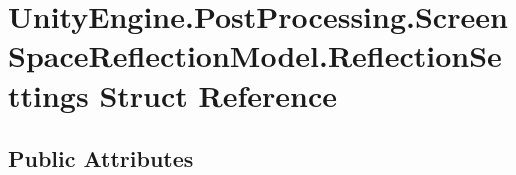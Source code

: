 \hypertarget{struct_unity_engine_1_1_post_processing_1_1_screen_space_reflection_model_1_1_reflection_settings}{}\section{Unity\+Engine.\+Post\+Processing.\+Screen\+Space\+Reflection\+Model.\+Reflection\+Settings Struct Reference}
\label{struct_unity_engine_1_1_post_processing_1_1_screen_space_reflection_model_1_1_reflection_settings}
\subsection*{Public Attributes}
